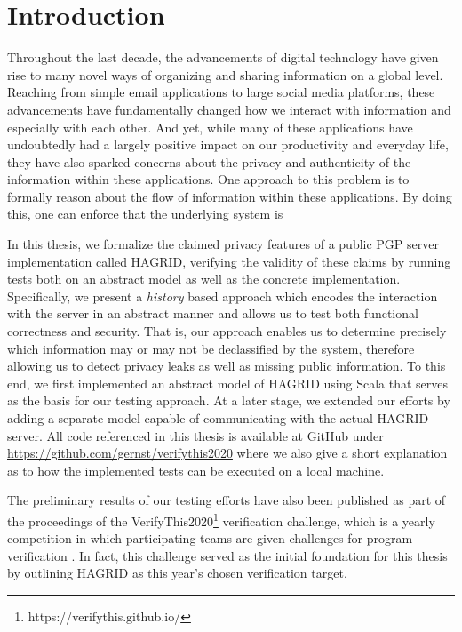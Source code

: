 
\section{Introduction}
Throughout the last decade, the advancements of digital technology have given rise to many novel ways of organizing and sharing information on a global level.
Reaching from simple email applications to large social media platforms, these advancements have fundamentally changed how we interact with information and especially with each other.
And yet, while many of these applications have undoubtedly had a largely positive impact on our productivity and everyday life, they have also sparked concerns about the privacy and authenticity of the information within these applications. 
One approach to this problem is to formally reason about the flow of information within these applications. By doing this, one can enforce that the underlying system is  

In this thesis, we formalize the claimed privacy features of a public PGP server implementation called HAGRID, verifying the validity of these claims by running tests both on an abstract model as well as the concrete implementation. Specifically, we present a \emph{history} based approach which encodes the interaction with the server in an abstract manner and allows us to test both functional correctness and security. That is, our approach enables us to determine precisely which information may or may not be declassified by the system, therefore allowing us to detect privacy leaks as well as missing public information. To this end, we first implemented an abstract model of HAGRID using Scala that serves as the basis for our testing approach. At a later stage, we extended our efforts by adding a separate model capable of communicating with the actual HAGRID server. All code referenced in this thesis is available at GitHub under \url{https://github.com/gernst/verifythis2020} where we also give a short explanation as to how the implemented tests can be executed on a local machine.

The preliminary results of our testing efforts have also been published as part of the proceedings of the VerifyThis2020\footnote{https://verifythis.github.io/} verification challenge, which is a yearly competition in which participating teams are given challenges for program verification \cite{VTLTC2020/IFTesting}. In fact, this challenge served as the initial foundation for this thesis by outlining HAGRID as this year's chosen verification target.

